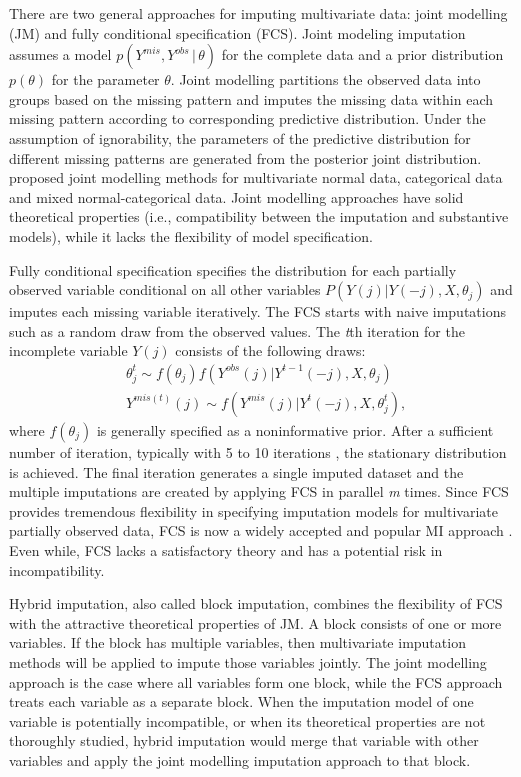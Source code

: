 There are two general approaches for imputing multivariate data: joint modelling (JM) and fully conditional specification (FCS). Joint modeling imputation assumes a model $p(Y^{mis}, Y^{obs}\,|\,\theta)$ for the complete data and a prior distribution $p(\theta)$ for the parameter $\theta$. Joint modelling partitions the observed data into groups based on the missing pattern and imputes the missing data within each missing pattern according to corresponding predictive distribution. Under the assumption of ignorability, the parameters of the predictive distribution for different missing patterns are generated from the posterior joint distribution. \citet{schafer1997analysis} proposed joint modelling methods for multivariate normal data, categorical data and mixed normal-categorical data. Joint modelling approaches have solid theoretical properties (i.e., compatibility between the imputation and substantive models), while it lacks the flexibility of model specification.

Fully conditional specification specifies the distribution for each partially observed variable conditional on all other variables $P(Y(j)|Y(-j), X, \theta_{j})$ and imputes each missing variable iteratively. The FCS starts with naive imputations such as a random draw from the observed values. The \emph{t}th iteration for the incomplete variable \emph{$Y(j)$} consists of the following draws:
\begin{align*}
	&\theta_{j}^{t} \sim f(\theta_{j})f(Y^{obs}(j)|Y^{t-1}(-j), X, \theta_{j})\\
	&Y^{mis(t)}(j) \sim f(Y^{mis}(j)|Y^{t}(-j), X, \theta_{j}^{t}),
\end{align*}
where $f(\theta_{j})$ is generally specified as a noninformative prior. After a sufficient number of iteration, typically with 5 to 10 iterations \citep{Buuren2018, oberman2020missing}, the stationary distribution is achieved. The final iteration generates a single imputed dataset and the multiple imputations are created by applying FCS in parallel \emph{m} times. Since FCS provides tremendous flexibility in specifying imputation models for multivariate partially observed data, FCS is now a widely accepted and popular MI approach \citep{van2007multiple}. Even while, FCS lacks a satisfactory theory and has a potential risk in incompatibility. 

Hybrid imputation, also called block imputation, combines the flexibility of FCS with the attractive theoretical properties of JM. A block consists of one or more variables. If the block has multiple variables, then multivariate imputation methods will be applied to impute those variables jointly. The joint modelling approach is the case where all variables form one block, while the FCS approach treats each variable as a separate block. 
When the imputation model of one variable is potentially incompatible, or when its theoretical properties are not thoroughly studied, hybrid imputation would merge that variable with other variables and apply the joint modelling imputation approach to that block. 

